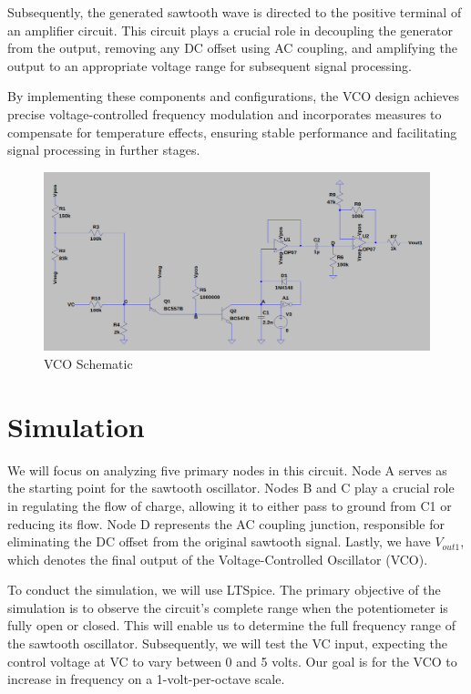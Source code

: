 \documentclass{article}
\begin{document}
Subsequently, the generated sawtooth wave is directed to the positive terminal of an amplifier circuit. This circuit plays a crucial role in decoupling the generator from the output, removing any DC offset using AC coupling, and amplifying the output to an appropriate voltage range for subsequent signal processing.

By implementing these components and configurations, the VCO design achieves precise voltage-controlled frequency modulation and incorporates measures to compensate for temperature effects, ensuring stable performance and facilitating signal processing in further stages.


\begin{figure}[H]
  \includegraphics[width=1\linewidth]{vco_schem.png}
  \caption{VCO Schematic}
\end{figure}


\section*{\textcolor{mycolor}{Simulation}}
We will focus on analyzing five primary nodes in this circuit. Node A serves as the starting point for the sawtooth oscillator. Nodes B and C play a crucial role in regulating the flow of charge, allowing it to either pass to ground from C1 or reducing its flow. Node D represents the AC coupling junction, responsible for eliminating the DC offset from the original sawtooth signal. Lastly, we have $V_{out1}$, which denotes the final output of the Voltage-Controlled Oscillator (VCO).

To conduct the simulation, we will use LTSpice. The primary objective of the simulation is to observe the circuit's complete range when the potentiometer is fully open or closed. This will enable us to determine the full frequency range of the sawtooth oscillator. Subsequently, we will test the VC input, expecting the control voltage at VC to vary between 0 and 5 volts. Our goal is for the VCO to increase in frequency on a 1-volt-per-octave scale.
\end{document}
